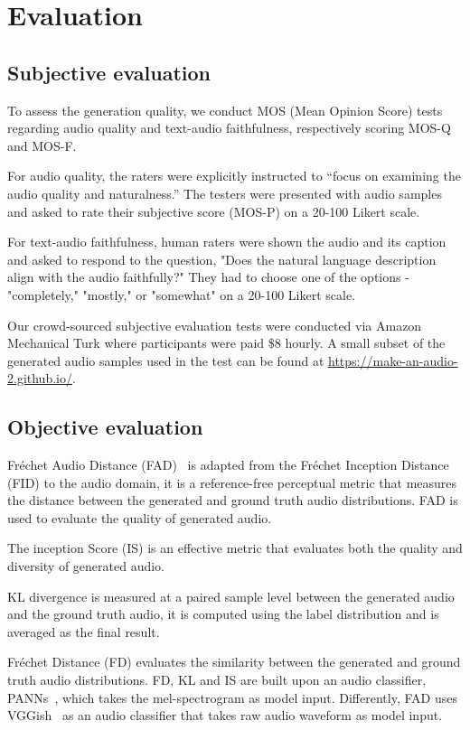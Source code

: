 \documentclass{article}
\begin{document}
\section{Evaluation} 
\subsection{Subjective evaluation}  \label{app:human_eval}
To assess the generation quality, we conduct MOS (Mean Opinion Score) tests regarding audio quality and text-audio faithfulness, respectively scoring MOS-Q and MOS-F. 

For audio quality, the raters were explicitly instructed to ``focus on examining the audio quality and naturalness.'' The testers were presented with audio samples and asked to rate their subjective score (MOS-P) on a 20-100 Likert scale. 

For text-audio faithfulness, human raters were shown the audio and its caption and asked to respond to the question, "Does the natural language description align with the audio faithfully?" They had to choose one of the options - "completely," "mostly," or "somewhat" on a 20-100 Likert scale. 

Our crowd-sourced subjective evaluation tests were conducted via Amazon Mechanical Turk where participants were paid \$8 hourly. A small subset of the generated audio samples used in the test can be found at \url{https://make-an-audio-2.github.io/}.

\subsection{Objective evaluation}  \label{app:obj_eval}
Fréchet Audio Distance (FAD)~\cite{kilgour2019frechet} is adapted from the Fréchet Inception Distance (FID) to the audio domain, it is a reference-free perceptual metric that measures the distance between the generated and ground truth audio distributions. FAD is used to evaluate the quality of generated audio.

The inception Score (IS) is an effective metric that evaluates both the quality and diversity of generated audio. 

KL divergence is measured at a paired sample level between the generated audio and the ground truth audio, it is computed using the label distribution and is averaged as the final result. 

Fréchet Distance (FD) evaluates the similarity between the generated and ground truth audio distributions. FD, KL and IS are built upon an audio classifier, PANNs~\cite{kong2020panns}, which takes the mel-spectrogram as model input. Differently, FAD uses VGGish~\cite{vggish_hershey2017cnn} as an audio classifier that takes raw audio waveform as model input. 
\end{document}
